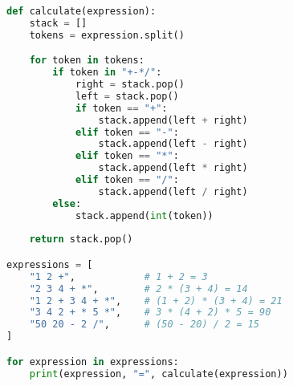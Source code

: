 \begin{lstlisting}[language=Python]
def calculate(expression):
    stack = []
    tokens = expression.split()

    for token in tokens:
        if token in "+-*/":
            right = stack.pop()
            left = stack.pop()
            if token == "+":
                stack.append(left + right)
            elif token == "-":
                stack.append(left - right)
            elif token == "*":
                stack.append(left * right)
            elif token == "/":
                stack.append(left / right)
        else:
            stack.append(int(token))
    
    return stack.pop()

expressions = [
    "1 2 +",            # 1 + 2 = 3
    "2 3 4 + *",        # 2 * (3 + 4) = 14
    "1 2 + 3 4 + *",    # (1 + 2) * (3 + 4) = 21
    "3 4 2 + * 5 *",    # 3 * (4 + 2) * 5 = 90
    "50 20 - 2 /",      # (50 - 20) / 2 = 15
]

for expression in expressions:
    print(expression, "=", calculate(expression))
\end{lstlisting}

\newpage